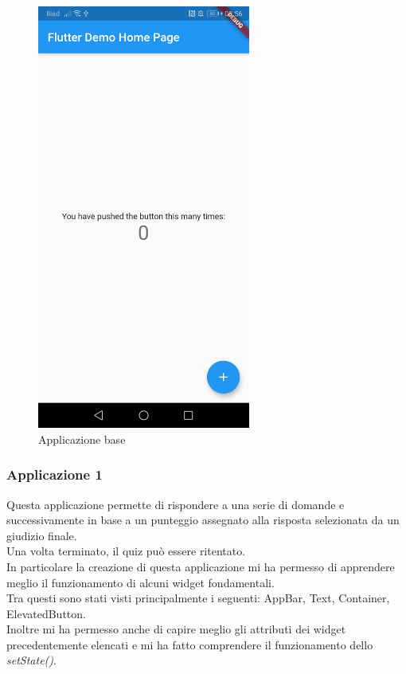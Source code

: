 \begin{figure}[htbp]	
	\centering
	\includegraphics[width=7cm]{immagini/base.jpeg}
	\caption{Applicazione base}
	\label{fig:Applicazione base}
\end{figure}

\newpage

\subsubsection{Applicazione 1}
Questa applicazione permette di rispondere a una serie di domande e successivamente in base a un punteggio assegnato alla risposta selezionata da un giudizio finale.\\
Una volta terminato, il quiz può essere ritentato.\\
In particolare la creazione di questa applicazione mi ha permesso di apprendere meglio il funzionamento di alcuni widget fondamentali.\\
Tra questi sono stati visti principalmente i seguenti: AppBar, Text, Container, ElevatedButton.\\
Inoltre mi ha permesso anche di capire meglio gli attributi dei widget precedentemente elencati e mi ha fatto comprendere il funzionamento dello \textit{setState()}.\\

